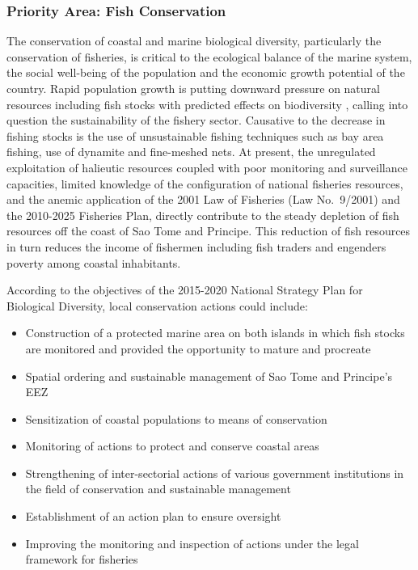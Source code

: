 \documentclass[
]{book}
\providecommand{\tightlist}{%
  \setlength{\itemsep}{0pt}\setlength{\parskip}{0pt}}
\begin{document}
\hypertarget{priority-area-fish-conservation-1}{%
\subsubsection{Priority Area: Fish Conservation}\label{priority-area-fish-conservation-1}}

The conservation of coastal and marine biological diversity, particularly the conservation of fisheries, is critical to the ecological balance of the marine system, the social well-being of the population and the economic growth potential of the country. Rapid population growth is putting downward pressure on natural resources including fish stocks with predicted effects on biodiversity , calling into question the sustainability of the fishery sector. Causative to the decrease in fishing stocks is the use of unsustainable fishing techniques such as bay area fishing, use of dynamite and fine-meshed nets. At present, the unregulated exploitation of halieutic resources coupled with poor monitoring and surveillance capacities, limited knowledge of the configuration of national fisheries resources, and the anemic application of the 2001 Law of Fisheries (Law No.~9/2001) and the 2010-2025 Fisheries Plan, directly contribute to the steady depletion of fish resources off the coast of Sao Tome and Principe. This reduction of fish resources in turn reduces the income of fishermen including fish traders and engenders poverty among coastal inhabitants.

According to the objectives of the 2015-2020 National Strategy Plan for Biological Diversity, local conservation actions could include:

\begin{itemize}
\tightlist
\item
  Construction of a protected marine area on both islands in which fish stocks are monitored and provided the opportunity to mature and procreate
\item
  Spatial ordering and sustainable management of Sao Tome and Principe's EEZ
\item
  Sensitization of coastal populations to means of conservation
\item
  Monitoring of actions to protect and conserve coastal areas
\item
  Strengthening of inter-sectorial actions of various government institutions in the field of conservation and sustainable management
\item
  Establishment of an action plan to ensure oversight
\item
  Improving the monitoring and inspection of actions under the legal framework for fisheries
\end{itemize}
\end{document}
